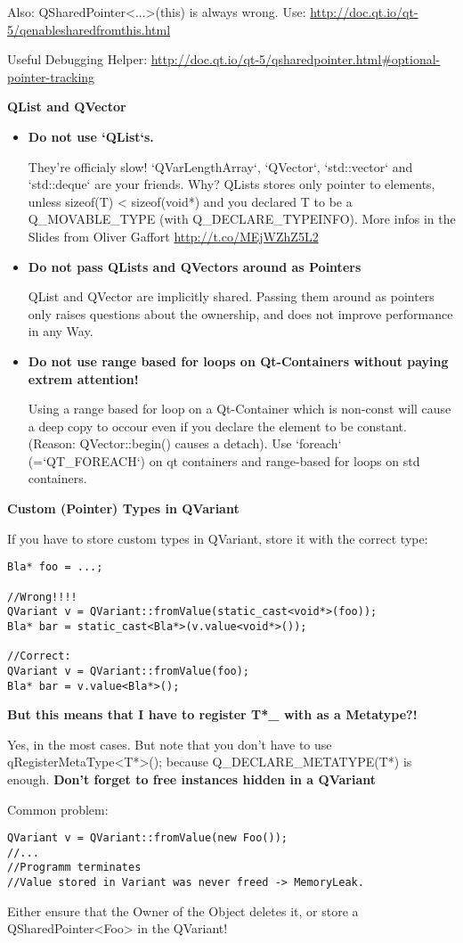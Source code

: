 Also: QSharedPointer<...>(this) is always wrong. Use: \url{http://doc.qt.io/qt-5/qenablesharedfromthis.html}

Useful Debugging Helper: \url{http://doc.qt.io/qt-5/qsharedpointer.html#optional-pointer-tracking}

\textbf{QList and QVector}
\begin{itemize}
	\item \textbf{Do not use `QList`s.} 
	
	They're officialy slow! `QVarLengthArray`, `QVector`, `std::vector` and `std::deque` are your friends.
	Why? QLists stores only pointer to elements, unless sizeof(T) < sizeof(void*) and you declared T to be a Q\_MOVABLE\_TYPE (with Q\_DECLARE\_TYPEINFO).
	More infos in the Slides from Oliver Gaffort \url{http://t.co/MEjWZhZ5L2}
	\item \textbf{Do not pass QLists and QVectors around as Pointers} 
	
	QList and QVector are implicitly shared. Passing them around as pointers only raises questions about the ownership, and does not improve performance in any Way.
	\item \textbf{Do not use range based for loops on Qt-Containers without paying extrem attention!}
	
	Using a range based for loop on a Qt-Container which is non-const will cause a deep copy to occour even if you declare the element to be constant. (Reason: QVector::begin() causes a detach). 
	Use `foreach` (=`QT\_FOREACH`) on qt containers and range-based for loops on std containers.
\end{itemize}
\textbf{Custom (Pointer) Types in QVariant}

If you have to store custom types in QVariant, store it with the correct type:
\begin{lstlisting}
Bla* foo = ...;

//Wrong!!!!
QVariant v = QVariant::fromValue(static_cast<void*>(foo));
Bla* bar = static_cast<Bla*>(v.value<void*>());

//Correct:
QVariant v = QVariant::fromValue(foo);
Bla* bar = v.value<Bla*>();
\end{lstlisting}

\textbf{But this means that I have to register T*\_ with as a Metatype?!}

Yes, in the most cases. 
But note that you don't have to use qRegisterMetaType\textless T*\textgreater(); because Q\_DECLARE\_METATYPE(T*) is enough.
\newpage
\textbf{Don't forget to free instances hidden in a QVariant}

Common problem:
\begin{lstlisting}
QVariant v = QVariant::fromValue(new Foo());
//... 
//Programm terminates
//Value stored in Variant was never freed -> MemoryLeak.
\end{lstlisting}

Either ensure that the Owner of the Object deletes it, or store a QSharedPointer<Foo> in the QVariant!












\endgroup